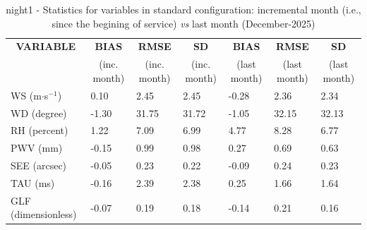 \begin{table}[h!]
\begin{center}
\begin{tabular}{|l|l|l|l|l|l|l|}
\hline
\multicolumn{1}{|c|}{\cellcolor[HTML]{C0C0C0}\textbf{VARIABLE}} & \multicolumn{1}{c|}{\cellcolor[HTML]{C0C0C0}\textbf{BIAS}} & \multicolumn{1}{c|}{\cellcolor[HTML]{C0C0C0}\textbf{RMSE}} & \multicolumn{1}{c|}{\cellcolor[HTML]{C0C0C0}\textbf{SD}} & \multicolumn{1}{c|}{\cellcolor[HTML]{C0C0C0}\textbf{BIAS}} & \multicolumn{1}{c|}{\cellcolor[HTML]{C0C0C0}\textbf{RMSE}} & \multicolumn{1}{c|}{\cellcolor[HTML]{C0C0C0}\textbf{SD}}\\
\multicolumn{1}{|c|}{\cellcolor[HTML]{C0C0C0}} & \multicolumn{1}{c|}{\cellcolor[HTML]{C0C0C0}(inc. month)} & \multicolumn{1}{c|}{\cellcolor[HTML]{C0C0C0}(inc. month)} & \multicolumn{1}{c|}{\cellcolor[HTML]{C0C0C0}(inc. month)} & \multicolumn{1}{c|}{\cellcolor[HTML]{C0C0C0}(last month)} & \multicolumn{1}{c|}{\cellcolor[HTML]{C0C0C0}(last month)} & \multicolumn{1}{c|}{\cellcolor[HTML]{C0C0C0}(last month)}\\\hline
\cellcolor[HTML]{C0C0C0}WS (m$\cdot$s$^{-1}$) &      0.10  &      2.45  &      2.45  &     -0.28     &      2.36     &      2.34\\
\cellcolor[HTML]{C0C0C0}WD (degree)           &     -1.30  &     31.75  &     31.72  &     -1.05     &     32.15     &     32.13\\
\cellcolor[HTML]{C0C0C0}RH (percent)          &      1.22  &      7.09  &      6.99  &      4.77     &      8.28     &      6.77\\
\cellcolor[HTML]{C0C0C0}PWV (mm)              &     -0.15 &      0.99 &      0.98 &      0.27    &      0.69    &      0.63\\
\cellcolor[HTML]{C0C0C0}SEE (arcsec)          &     -0.05 &      0.23 &      0.22 &     -0.09    &      0.24    &      0.23\\
\cellcolor[HTML]{C0C0C0}TAU (ms)              &     -0.16 &      2.39 &      2.38 &      0.25    &      1.66    &      1.64\\
\cellcolor[HTML]{C0C0C0}GLF (dimensionless)   &     -0.07 &      0.19 &      0.18 &     -0.14    &      0.21    &      0.16\\
\hline
\end{tabular}
\caption{night1 - Statistics for variables in standard configuration: incremental month (i.e., since the begining of service) \textit{vs} last month (December-2025)}\label{tab:night1:statBEF}
\end{center}
\end{table}

